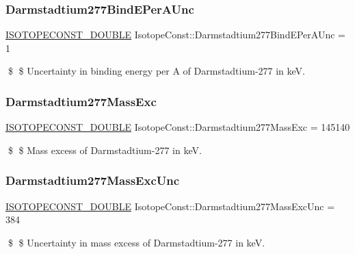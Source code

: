 \subsubsection{\texorpdfstring{Darmstadtium277\+Bind\+E\+Per\+A\+Unc}{Darmstadtium277BindEPerAUnc}}
{\footnotesize\ttfamily \mbox{\hyperlink{group___isotope_const-_macros_ga8f45a7272ce02c0b4c65c44636ed719a}{I\+S\+O\+T\+O\+P\+E\+C\+O\+N\+S\+T\+\_\+\+D\+O\+U\+B\+LE}} Isotope\+Const\+::\+Darmstadtium277\+Bind\+E\+Per\+A\+Unc = 1}

\$ \$ Uncertainty in binding energy per A of Darmstadtium-\/277 in keV. \mbox{\label{group___isotope_const-_darmstadtium-_ds277_ga2062f519d47282dbda320f6a76368e96}} 
\subsubsection{\texorpdfstring{Darmstadtium277\+Mass\+Exc}{Darmstadtium277MassExc}}
{\footnotesize\ttfamily \mbox{\hyperlink{group___isotope_const-_macros_ga8f45a7272ce02c0b4c65c44636ed719a}{I\+S\+O\+T\+O\+P\+E\+C\+O\+N\+S\+T\+\_\+\+D\+O\+U\+B\+LE}} Isotope\+Const\+::\+Darmstadtium277\+Mass\+Exc = 145140}

\$ \$ Mass excess of Darmstadtium-\/277 in keV. \mbox{\label{group___isotope_const-_darmstadtium-_ds277_gafeee3eaa2241fa267fb8b5380affa7cb}} 
\subsubsection{\texorpdfstring{Darmstadtium277\+Mass\+Exc\+Unc}{Darmstadtium277MassExcUnc}}
{\footnotesize\ttfamily \mbox{\hyperlink{group___isotope_const-_macros_ga8f45a7272ce02c0b4c65c44636ed719a}{I\+S\+O\+T\+O\+P\+E\+C\+O\+N\+S\+T\+\_\+\+D\+O\+U\+B\+LE}} Isotope\+Const\+::\+Darmstadtium277\+Mass\+Exc\+Unc = 384}

\$ \$ Uncertainty in mass excess of Darmstadtium-\/277 in keV. \mbox{\label{group___isotope_const-_darmstadtium-_ds277_gad88eb6a28d56c83c808cced24bcadae8}} 
